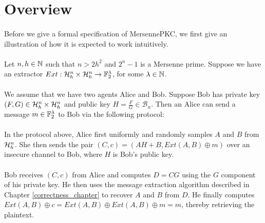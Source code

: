 \section{Overview}
\paragraph{}
Before we give a formal specification of MersennePKC, we first give an illustration of how it is expected to work intuitively.

\paragraph{}
Let $n, h \in \mathbb{N}$ such that $n > 2h^2$ and $2^n - 1$ is a Mersenne prime. Suppose we have an extractor $Ext: \mathcal{H}_h^n \times \mathcal{H}_h^n \rightarrow \mathbb{F}_2^\lambda$, for some $\lambda \in \mathbb{N}$.

\paragraph{}
We assume that we have two agents Alice and Bob. Suppose Bob has private key $(F, G) \in \mathcal{H}_h^n \times \mathcal{H}_h^n$ and public key $H = \frac{F}{G} \in \mathcal{B}_n$. Then an Alice can send a message $m \in \mathbb{F}_2^\lambda$ to Bob via the following protocol:


\paragraph{}
In the protocol above, Alice first uniformly and randomly samples $A$ and $B$ from $\mathcal{H}_h^n$. She then sends the pair $(C, c) = (AH + B, Ext(A, B) \oplus m)$ over an insecure channel to Bob, where $H$ is Bob's public key.

\paragraph{}
Bob receives $(C, c)$ from Alice and computes $D = CG$ using the $G$ component of his private key. He then uses the message extraction algorithm described in Chapter \ref{correctness_chapter} to recover $A$ and $B$ from $D$. He finally computes $Ext(A,B) \oplus c = Ext(A, B) \oplus Ext(A, B) \oplus m = m$, thereby retrieving the plaintext.

